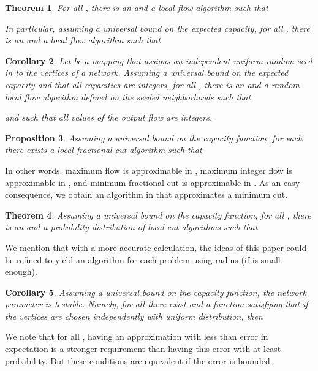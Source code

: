 \documentclass[12pt,a4paper]{article}
\newtheorem{Theorem}{Theorem}
\newtheorem{Corollary}[Theorem]{Corollary}
\newtheorem{Proposition}[Theorem]{Proposition}
\renewcommand{\:}{\colon}
\begin{document}
\begin{Theorem} \label{localg}
For all , there is an  and a local flow algorithm  such that 

In particular, assuming a universal bound  on the expected capacity, for all , there is an  and a local flow algorithm  such that 

\end{Theorem}

\begin{Corollary}\label{cor:integerflow}
Let  be a mapping that assigns an independent uniform random seed in  to the vertices of a network. 
Assuming a universal bound  on the  expected capacity and that all capacities are integers, for all , there is an  and a random local flow algorithm  defined on the seeded neighborhoods such that 

and such that all values of the output flow are integers. 
\end{Corollary}

\begin{Proposition} \label{localgfraccut}
Assuming a universal bound  on the capacity function, for each  there exists a local fractional cut algorithm such that 
 \end{Proposition}

In other words, maximum flow is approximable in , maximum integer flow is approximable in , and minimum fractional cut is approximable in . 
As an easy consequence, we obtain an algorithm in  that approximates a minimum cut. 

\begin{Theorem} \label{localgcut}
Assuming a universal bound  on the capacity function, for all , there is an  and a probability distribution  of local cut algorithms  such that 

\end{Theorem}

We mention that with a more accurate calculation, the ideas of this paper could be refined to yield an algorithm for each problem using radius  (if  is small enough).

\begin{Corollary} \label{testable}
Assuming a universal bound  on the capacity function, the network parameter  is testable. 
Namely, for all  there exist  and a function  satisfying that if the vertices  are chosen independently with uniform distribution, then

\end{Corollary}

We note that for all , having an approximation with less than  error in expectation is a stronger requirement than having this error with at least  probability. 
But these conditions are equivalent if the error is bounded.
\end{document}
